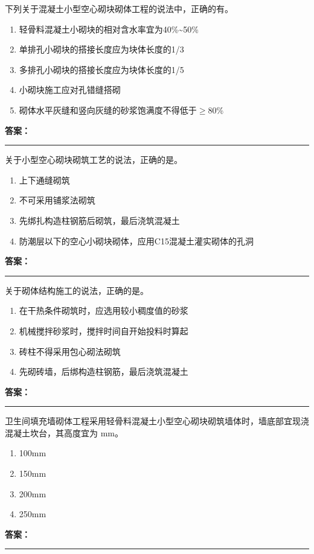 \documentclass[UTF8,fontset=fandol,11pt]{ctexart}
\newcommand{\answerline}{\textcolor{answerred}{\rule{2.4cm}{0.7pt}}}
\begin{document}
\begin{quizbox}[title={第 28 题}]
下列关于混凝土小型空心砌块砌体工程的说法中，正确的有。\\
\begin{enumerate}[label=\Alph*.]
\item 轻骨料混凝土小砌块的相对含水率宜为40\%\textasciitilde{}50\%
\item 单排孔小砌块的搭接长度应为块体长度的1/3
\item 多排孔小砌块的搭接长度应为块体长度的1/5
\item 小砌块施工应对孔错缝搭砌
\item 砌体水平灰缝和竖向灰缝的砂浆饱满度不得低于$\geq$80\%
\end{enumerate}
\textbf{\textcolor{answerred}{答案：}} \answerline
\end{quizbox}

\begin{quizbox}[title={第 29 题}]
关于小型空心砌块砌筑工艺的说法，正确的是。\\
\begin{enumerate}[label=\Alph*.]
\item 上下通缝砌筑
\item 不可采用铺浆法砌筑
\item 先绑扎构造柱钢筋后砌筑，最后浇筑混凝土
\item 防潮层以下的空心小砌块砌体，应用C15混凝土灌实砌体的孔洞
\end{enumerate}
\textbf{\textcolor{answerred}{答案：}} \answerline
\end{quizbox}

\begin{quizbox}[title={第 30 题}]
关于砌体结构施工的说法，正确的是。\\
\begin{enumerate}[label=\Alph*.]
\item 在干热条件砌筑时，应选用较小稠度值的砂浆
\item 机械搅拌砂浆时，搅拌时间自开始投料时算起
\item 砖柱不得采用包心砌法砌筑
\item 先砌砖墙，后绑构造柱钢筋，最后浇筑混凝土
\end{enumerate}
\textbf{\textcolor{answerred}{答案：}} \answerline
\end{quizbox}

\begin{quizbox}[title={第 31 题}]
卫生间填充墙砌体工程采用轻骨料混凝土小型空心砌块砌筑墙体时，墙底部宜现浇混凝土坎台，其高度宜为 mm。\\
\begin{enumerate}[label=\Alph*.]
\item 100mm
\item 150mm
\item 200mm
\item 250mm
\end{enumerate}
\textbf{\textcolor{answerred}{答案：}} \answerline
\end{quizbox}
\end{document}
